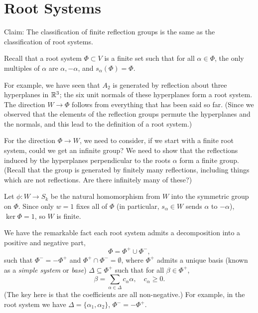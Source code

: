 \section{Root Systems}

Claim: The classification of finite reflection groups is the same as
the classification of root systems.

Recall that a root system $\Phi \subset V$ is a finite set such that for all
$\alpha \in \Phi$, the only multiples of $\alpha$ are $\alpha, -\alpha$, and
$s_\alpha(\Phi) = \Phi$.

For example, we have seen that $A_2$ is generated by reflection about three
hyperplanes in $\mathbb{R}^3$; the six unit normals of these hyperplanes form a root
system.
\\

The direction $W \to \Phi$ follows from everything that has been said so far.
(Since we observed that the elements of the reflection groups permute the
hyperplanes and the normals, and this lead to the definition of a root system.)

For the direction $\Phi \to W$, we need to consider, if we start with a finite
root system, could we get an infinite group? We need to show that the
reflections induced by the hyperplanes perpendicular to the roots $\alpha$ form
a finite group. (Recall that the group is generated by finitely many reflections,
including things which are not reflections. Are there infinitely many of these?)

Let $\phi : W \to S_k$ be the natural homomorphism from $W$ into the symmetric
group on $\Phi$. Since only $w=1$ fixes all of $\Phi$ (in particular, $s_\alpha
\in W$ sends $\alpha$ to $-\alpha$), $\ker \Phi = 1$, so $W$ is finite.

We have the remarkable fact each root system admits a decomposition into a
positive and negative part,
\[
    \Phi = \Phi^+ \cup \Phi^-,
\]
such that $\Phi^- = -\Phi^+$ and $\Phi^+ \cap \Phi^- = \emptyset$, where
$\Phi^+$ admits a unique basis (known as a {\em simple system} or {\em base})
$\Delta \subseteq \Phi^+$ such that for all $\beta \in \Phi^+$,
\[
    \beta = \sum_{\alpha \in \Delta} c_\alpha \alpha,
    \quad c_\alpha \geq 0.
\]
(The key here is that the coefficients are all non-negative.)
For example, in the root system
we have $\Delta = \{\alpha_1, \alpha_2\}$, $\Phi^- = -\Phi^+$.
\\

